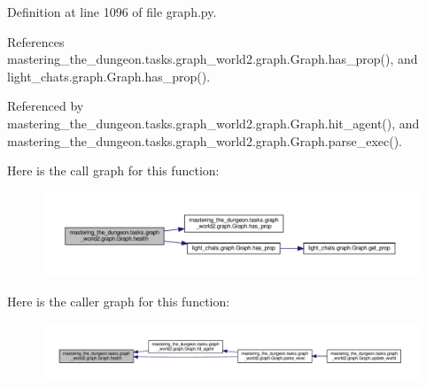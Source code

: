 Definition at line 1096 of file graph.\+py.



References mastering\+\_\+the\+\_\+dungeon.\+tasks.\+graph\+\_\+world2.\+graph.\+Graph.\+has\+\_\+prop(), and light\+\_\+chats.\+graph.\+Graph.\+has\+\_\+prop().



Referenced by mastering\+\_\+the\+\_\+dungeon.\+tasks.\+graph\+\_\+world2.\+graph.\+Graph.\+hit\+\_\+agent(), and mastering\+\_\+the\+\_\+dungeon.\+tasks.\+graph\+\_\+world2.\+graph.\+Graph.\+parse\+\_\+exec().

Here is the call graph for this function\+:
\nopagebreak
\begin{figure}[H]
\begin{center}
\leavevmode
\includegraphics[width=350pt]{classmastering__the__dungeon_1_1tasks_1_1graph__world2_1_1graph_1_1Graph_a5c3264184a314f9c922dfa85adbc1317_cgraph}
\end{center}
\end{figure}
Here is the caller graph for this function\+:
\nopagebreak
\begin{figure}[H]
\begin{center}
\leavevmode
\includegraphics[width=350pt]{classmastering__the__dungeon_1_1tasks_1_1graph__world2_1_1graph_1_1Graph_a5c3264184a314f9c922dfa85adbc1317_icgraph}
\end{center}
\end{figure}
\mbox{\label{classmastering__the__dungeon_1_1tasks_1_1graph__world2_1_1graph_1_1Graph_a1a09e41d73b4ddb7052ac6c4f29ba6ed}} 
